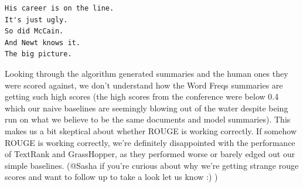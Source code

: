 \documentclass[11pt]{article}
\begin{document}
\begin{verbatim}
His career is on the line.
It's just ugly.
So did McCain.
And Newt knows it.
The big picture.
\end{verbatim}

Looking through the algorithm generated summaries and the human ones they were scored against, we don't understand how the Word Freqs summaries are getting such high scores (the high scores from the conference were below 0.4 which our naive baselines are seemingly blowing out of the water despite being run on what we believe to be the same documents and model summaries). This makes us a bit skeptical about whether ROUGE is working correctly. If somehow ROUGE is working correctly, we're definitely disappointed with the performance of TextRank and GrassHopper, as they performed worse or barely edged out our simple baselines. (@Sasha if you're curious about why we're getting strange rouge scores and want to follow up to take a look let us know :) )

\begin{table}[]
\centering
\caption{Resulting Rouge-1 and Rouge-2 Recall Scores}
\label{tab:results}
\end{table}
\end{document}
